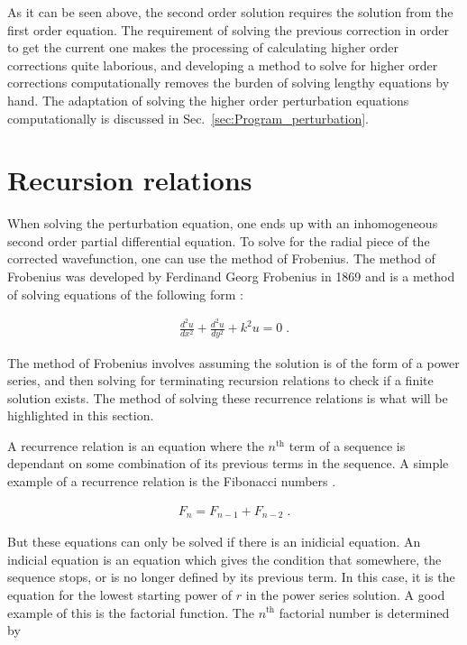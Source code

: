         \noindent As it can be seen above, the second order solution requires the solution from the first order equation. The requirement of solving the previous correction in order to get the current one makes the processing of calculating higher order corrections quite laborious, and developing a method to solve for higher order corrections computationally removes the burden of solving lengthy equations by hand. The adaptation of solving the higher order perturbation equations computationally is discussed in Sec.~\ref{sec:Program_perturbation}.

    \section{Recursion relations} \label{sec:Recursion_Relations}
        When solving the perturbation equation, one ends up with an inhomogeneous second order partial differential equation. To solve for the radial piece of the corrected wavefunction, one can use the method of Frobenius. The method of Frobenius was developed by Ferdinand Georg Frobenius in 1869 and is a method of solving equations of the following form \cite{Weber1869}:
        
        \begin{align}
            \frac{d^2 u}{dx^2} + \frac{d^2 u}{dy^2} + k^2 u = 0\;.
        \end{align}

        \noindent The method of Frobenius involves assuming the solution is of the form of a power series, and then solving for terminating recursion relations to check if a finite solution exists. The method of solving these recurrence relations is what will be highlighted in this section. 

        A recurrence relation is an equation where the $n^{\text{th}}$ term of a sequence is dependant on some combination of its previous terms in the sequence. A simple example of a recurrence relation is the Fibonacci numbers \cite{Liber_Abaci}.

        \begin{align}
            F_n = F_{n - 1} + F_{n - 2}\;.
        \end{align}

        \noindent But these equations can only be solved if there is an inidicial equation. An indicial equation is an equation which gives the condition that somewhere, the sequence stops, or is no longer defined by its previous term. In this case, it is the equation for the lowest starting power of $r$ in the power series solution. A good example of this is the factorial function. The $n^{\text{th}}$ factorial number is determined by 

